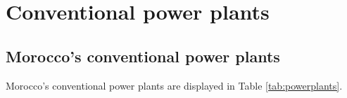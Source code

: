 
\section{Conventional power plants}
\subsection{Morocco's conventional power plants}
Morocco's conventional power plants are displayed in Table \ref{tab:powerplants}.

\clearpage
\begin{footnotesize}
    
\end{footnotesize}
\clearpage